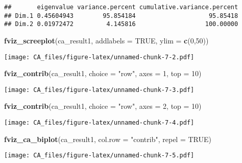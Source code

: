 \documentclass[]{article}
\newenvironment{Shaded}{\begin{snugshade}}{\end{snugshade}}
\newcommand{\KeywordTok}[1]{\textcolor[rgb]{0.13,0.29,0.53}{\textbf{#1}}}
\newcommand{\DataTypeTok}[1]{\textcolor[rgb]{0.13,0.29,0.53}{#1}}
\newcommand{\DecValTok}[1]{\textcolor[rgb]{0.00,0.00,0.81}{#1}}
\newcommand{\StringTok}[1]{\textcolor[rgb]{0.31,0.60,0.02}{#1}}
\newcommand{\OtherTok}[1]{\textcolor[rgb]{0.56,0.35,0.01}{#1}}
\newcommand{\NormalTok}[1]{#1}
\begin{document}
\begin{verbatim}
##       eigenvalue variance.percent cumulative.variance.percent
## Dim.1 0.45604943        95.854184                    95.85418
## Dim.2 0.01972472         4.145816                   100.00000
\end{verbatim}

\begin{Shaded}
\begin{Highlighting}[]
\KeywordTok{fviz_screeplot}\NormalTok{(ca_result1, }\DataTypeTok{addlabels =} \OtherTok{TRUE}\NormalTok{, }\DataTypeTok{ylim =} \KeywordTok{c}\NormalTok{(}\DecValTok{0}\NormalTok{,}\DecValTok{50}\NormalTok{))}
\end{Highlighting}
\end{Shaded}

\texttt{[image: CA\_files/figure-latex/unnamed-chunk-7-2.pdf]}

\begin{Shaded}
\begin{Highlighting}[]
\KeywordTok{fviz_contrib}\NormalTok{(ca_result1, }\DataTypeTok{choice =} \StringTok{"row"}\NormalTok{, }\DataTypeTok{axes =} \DecValTok{1}\NormalTok{, }\DataTypeTok{top =} \DecValTok{10}\NormalTok{) }
\end{Highlighting}
\end{Shaded}

\texttt{[image: CA\_files/figure-latex/unnamed-chunk-7-3.pdf]}

\begin{Shaded}
\begin{Highlighting}[]
\KeywordTok{fviz_contrib}\NormalTok{(ca_result1, }\DataTypeTok{choice =} \StringTok{"row"}\NormalTok{, }\DataTypeTok{axes =} \DecValTok{2}\NormalTok{, }\DataTypeTok{top =} \DecValTok{10}\NormalTok{) }
\end{Highlighting}
\end{Shaded}

\texttt{[image: CA\_files/figure-latex/unnamed-chunk-7-4.pdf]}

\begin{Shaded}
\begin{Highlighting}[]
\KeywordTok{fviz_ca_biplot}\NormalTok{(ca_result1, }\DataTypeTok{col.row =} \StringTok{"contrib"}\NormalTok{, }\DataTypeTok{repel =} \OtherTok{TRUE}\NormalTok{)}
\end{Highlighting}
\end{Shaded}

\texttt{[image: CA\_files/figure-latex/unnamed-chunk-7-5.pdf]}
\end{document}
